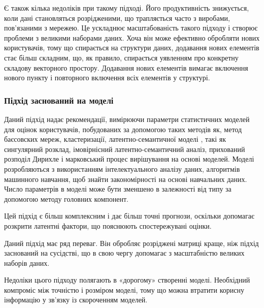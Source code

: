 Є також кілька недоліків при такому підході. Його продуктивність знижується, коли дані становляться розрідженими, що трапляється часто з виробами, пов'язаними з мережею. Це ускладнює масштабованість такого підходу і створює проблеми з великими наборами даних. Хоча він може ефективно обробляти нових користувачів, тому що спирається на структури даних, додавання нових елементів стає більш складним, що, як правило, спирається уявленням про конкретну складову векторного простору. Додавання нових елементів вимагає включення нового пункту і повторного включення всіх елементів у структурі.

\subsubsection{Підхід заснований на моделі}

Даний підхід надає рекомендації, вимірюючи параметри статистичних моделей для оцінок користувачів, побудованих за допомогою таких методів як, метод баєсовских мереж, кластеризації, латентно-семантичної моделі , такі як сингулярний розклад, імовірнісний латентно-семантичний аналіз, прихований розподіл Дирихле і марковський процес вирішування на основі моделей. Моделі розробляються з використанням інтелектуального аналізу даних, алгоритмів машинного навчання, щоб знайти закономірності на основі навчальних даних. Число параметрів в моделі може бути зменшено в залежності від типу за допомогою методу головних компонент.

Цей підхід є більш комплексним і дає більш точні прогнози, оскільки допомагає розкрити латентні фактори, що пояснюють спостережувані оцінки.

Даний підхід має ряд переваг. Він обробляє розріджені матриці краще, ніж підхід заснований на сусідстві, що в свою чергу допомагає з масштабністю великих наборів даних.

Недоліки цього підходу полягають в «дорогому» створенні моделі. Необхідний компроміс між точністю і розміром моделі, тому що можна втратити корисну інформацію у зв'язку із скороченням моделей.

